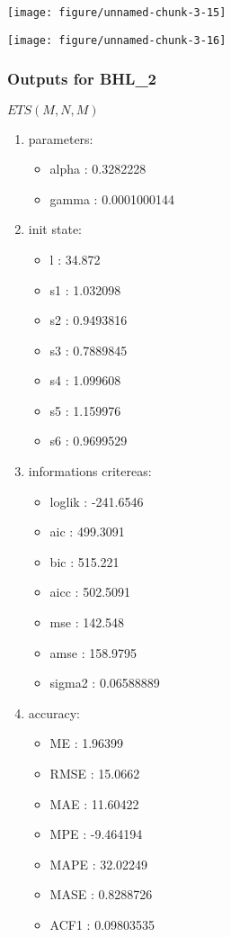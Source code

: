 \documentclass[10pt,a4paper]{article}\usepackage[]{graphicx}\usepackage[]{color}
\makeatletter
\def\maxwidth{ %
  \ifdim\Gin@nat@width>\linewidth
    \linewidth
  \else
    \Gin@nat@width
  \fi
}
\newcommand{\AaA}{\_}
\makeatother
\begin{document}
\texttt{[image: figure/unnamed-chunk-3-15]} 

\newpage

\texttt{[image: figure/unnamed-chunk-3-16]} 

\newpage
\subsubsection{Outputs for BHL\AaA 2}
\begin{multicols}{2}


$ ETS(M,N,M) $
\begin{enumerate}
\item parameters:
\begin{itemize}
\item  alpha :  0.3282228 
\item  gamma :  0.0001000144 
\end{itemize}
\item init state:
\begin{itemize}
\item  l :  34.872 
\item  s1 :  1.032098 
\item  s2 :  0.9493816 
\item  s3 :  0.7889845 
\item  s4 :  1.099608 
\item  s5 :  1.159976 
\item  s6 :  0.9699529 
\end{itemize}
\item informations critereas:
\begin{itemize}
\item  loglik :  -241.6546 
\item  aic :  499.3091 
\item  bic :  515.221 
\item  aicc :  502.5091 
\item  mse :  142.548 
\item  amse :  158.9795 
\item  sigma2 :  0.06588889 
\end{itemize}
\item accuracy:
\begin{itemize}
\item  ME :  1.96399 
\item  RMSE :  15.0662 
\item  MAE :  11.60422 
\item  MPE :  -9.464194 
\item  MAPE :  32.02249 
\item  MASE :  0.8288726 
\item  ACF1 :  0.09803535 
\end{itemize}
\end{enumerate}


\end{multicols}
\end{document}
